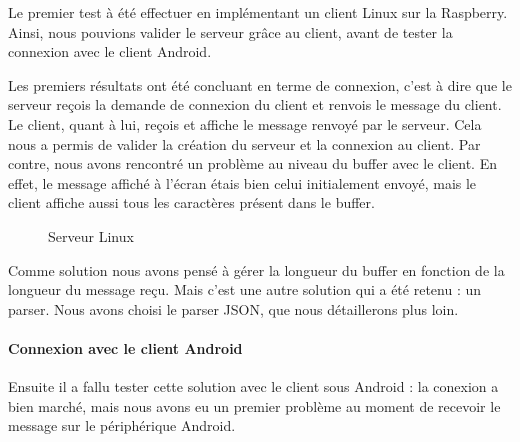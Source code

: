 \documentclass[a4paper,10pt]{article}
\begin{document}
Le premier test à été effectuer en implémentant un client Linux sur la Raspberry. Ainsi, nous pouvions valider le serveur grâce au client, avant de tester la connexion avec le client Android.

Les premiers résultats ont été concluant en terme de connexion, c'est à dire que le serveur reçois la demande de connexion du client et renvois le message du client. Le client, quant à lui, reçois et affiche le message renvoyé par le serveur. Cela nous a permis de valider la création du serveur et la connexion au client. Par contre, nous avons rencontré un problème au niveau du buffer avec le client. En effet, le message affiché à l'écran étais bien celui initialement envoyé, mais le client affiche aussi tous les caractères présent dans le buffer.

\begin{figure}[h]
  \begin{center}
    \caption{Serveur Linux}
    \label{fig:serv_simple}
  \end{center}
\end{figure}

Comme solution nous avons pensé à gérer la longueur du buffer en fonction de la longueur du message reçu. Mais c'est une autre solution qui a été retenu : un parser. Nous avons choisi le parser JSON, que nous détaillerons plus loin.


\paragraph{Connexion avec le client Android}
Ensuite il a fallu tester cette solution avec le client sous Android : la conexion a bien marché, mais nous avons eu un premier problème au moment de recevoir le message sur le périphérique Android.
\end{document}
